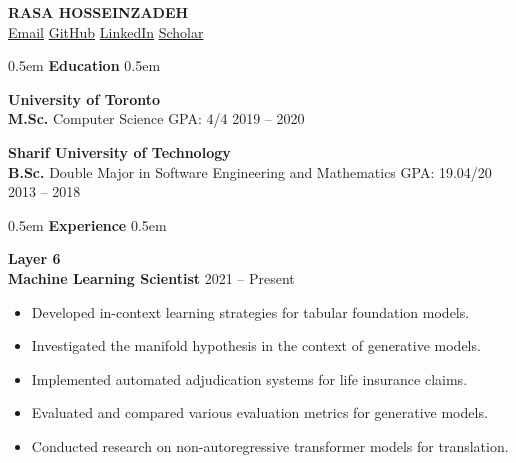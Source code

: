 \documentclass[11pt,a4paper]{article}
\newcommand{\cvsection}[1]{%
    \vspace{10pt}
    \noindent\hfill\kern0.5em
    {\Huge \textbf{\textcolor{maincolor}{#1}}}%
    \kern0.5em\hfill\vspace{8pt}
}
\begin{document}
\RaggedRight %

\begin{center}
    {\Huge \textbf{\MakeUppercase{Rasa Hosseinzadeh}}} \\[5pt]
    \href{mailto:rasa.hosseinzadeh@gmail.com}{\textcolor{maincolor}{\faEnvelope}\hspace{0.5em} Email} \hspace{1.5em}
    \href{https://github.com/rasaHosseinzadeh}{\textcolor{maincolor}{\faGithub}\hspace{0.5em} GitHub} \hspace{1.5em}
    \href{https://linkedin.com/in/rasa-hosseinzadeh-6204a6208}{\textcolor{maincolor}{\faLinkedin}\hspace{0.5em} LinkedIn} \hspace{1.5em}
    \href{https://scholar.google.com/citations?user=1Evd7mYAAAAJ}{\textcolor{maincolor}{\faGraduationCap}\hspace{0.5em} Scholar}
\end{center}
\vspace{15pt}

\cvsection{Education}

{\Large \textbf{\textcolor{maincolor}{University of Toronto}}} \\
\textbf{M.Sc.} \hspace{1.4em} Computer Science \hspace{18.0em} GPA: 4/4 \hfill 2019 -- 2020 \\
\vspace{8pt}

{\Large \textbf{\textcolor{maincolor}{Sharif University of Technology}}} \\
\textbf{B.Sc.} \hspace{1.7em} Double Major in Software Engineering and Mathematics \hfill GPA: 19.04/20 \hfill 2013 -- 2018 \\
\vspace{15pt}

\cvsection{Experience}

{\Large \textbf{\textcolor{maincolor}{Layer 6}}} \\
\textbf{Machine Learning Scientist} \hfill 2021 -- Present
\begin{itemize}[noitemsep, topsep=4pt, leftmargin=1.5em, label=\textcolor{maincolorlight}{$\circ$}]
    \item Developed in-context learning strategies for tabular foundation models.
    \item Investigated the manifold hypothesis in the context of generative models.
    \item Implemented automated adjudication systems for life insurance claims.
    \item Evaluated and compared various evaluation metrics for generative models.
    \item Conducted research on non-autoregressive transformer models for translation.
\end{itemize}
\vspace{10pt}
\end{document}
